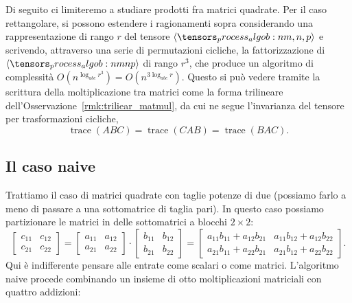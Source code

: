 \begin{remark}
	\label{rem:rectangular}
	Di seguito ci limiteremo a studiare prodotti fra matrici quadrate. Per il caso rettangolare, si
	possono estendere i ragionamenti sopra considerando una rappresentazione di rango $ r $ del
	tensore $ \algob{m,n,p} $ e scrivendo, attraverso una serie di permutazioni cicliche, la fattorizzazione di $ \algob{mnp} $ di rango $ r^3 $, che produce un algoritmo di complessità $ O(n^{\log_{abc}r^3}) =
		O(n^{3\log_{abc}r})$. Questo si può vedere tramite la scrittura della moltiplicazione tra matrici
	come la forma trilineare dell'Osservazione~\ref{rmk:triliear_matmul}, da cui ne segue l'invarianza
	del tensore per trasformazioni cicliche,
	\begin{equation}
		\mathop{trace}(ABC) = \mathop{trace}(CAB) = \mathop{trace}(BAC).
	\end{equation}
\end{remark}


\subsection*{Il caso naive}

Trattiamo il caso di matrici quadrate con taglie potenze di due (possiamo farlo a meno di passare a
una sottomatrice di taglia pari). In questo caso possiamo
partizionare le matrici in delle sottomatrici a blocchi $ 2\times 2 $:
\begin{equation*}
	\begin{bmatrix}
		c_{11} & c_{12} \\
		c_{21} & c_{22}
	\end{bmatrix} =
	\begin{bmatrix}
		a_{11} & a_{12} \\
		a_{21} & a_{22}
	\end{bmatrix} \cdot
	\begin{bmatrix}
		b_{11} & b_{12} \\
		b_{21} & b_{22}
	\end{bmatrix} =
	\begin{bmatrix}
		a_{11}b_{11} + a_{12}b_{21} & a_{11}b_{12} + a_{12}b_{22} \\
		a_{21}b_{11} + a_{22}b_{21} & a_{21}b_{12} + a_{22}b_{22}
	\end{bmatrix}.
\end{equation*}
Qui è indifferente pensare alle entrate come scalari o come matrici.
L'algoritmo naive procede combinando un insieme di otto moltiplicazioni matriciali con quattro
addizioni:


